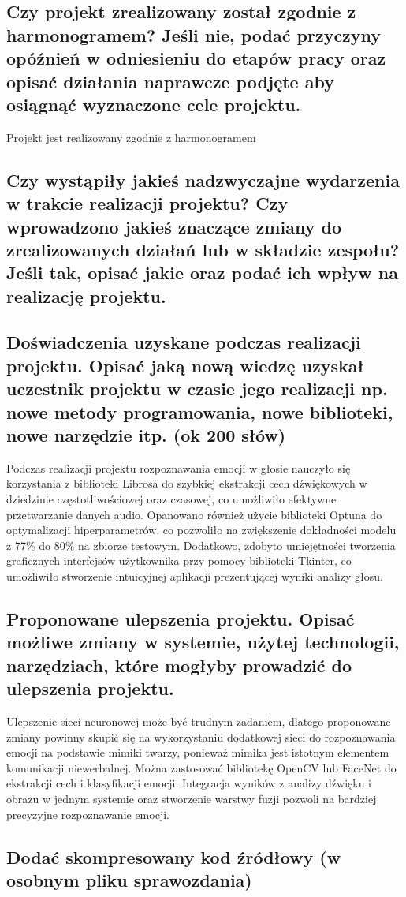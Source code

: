 \documentclass[12pt,titlepage]{article}
\begin{document}
\subsection{Czy projekt zrealizowany został zgodnie z harmonogramem? Jeśli nie, podać przyczyny opóźnień w odniesieniu do etapów pracy oraz opisać działania naprawcze podjęte aby osiągnąć wyznaczone cele projektu.}
Projekt jest realizowany zgodnie z harmonogramem

\subsection{Czy wystąpiły jakieś nadzwyczajne wydarzenia w trakcie realizacji projektu? Czy wprowadzono jakieś znaczące zmiany do zrealizowanych działań lub w składzie zespołu? Jeśli tak, opisać jakie oraz podać ich wpływ na realizację projektu.}

\subsection{Doświadczenia uzyskane podczas realizacji projektu. Opisać jaką nową wiedzę uzyskał uczestnik projektu w czasie jego realizacji np. nowe metody programowania, nowe biblioteki, nowe narzędzie itp. (ok 200 słów)}
Podczas realizacji projektu rozpoznawania emocji w głosie nauczyło się korzystania z biblioteki Librosa do szybkiej ekstrakcji cech dźwiękowych w dziedzinie częstotliwościowej oraz czasowej, co umożliwiło efektywne przetwarzanie danych audio. Opanowano również użycie biblioteki Optuna do optymalizacji hiperparametrów, co pozwoliło na zwiększenie dokładności modelu z 77\% do 80\% na zbiorze testowym. Dodatkowo, zdobyto umiejętności tworzenia graficznych interfejsów użytkownika przy pomocy biblioteki Tkinter, co umożliwiło stworzenie intuicyjnej aplikacji prezentującej wyniki analizy głosu.

\subsection{Proponowane ulepszenia projektu. Opisać możliwe zmiany w systemie, użytej technologii, narzędziach, które mogłyby prowadzić do ulepszenia projektu.}
Ulepszenie sieci neuronowej może być trudnym zadaniem, dlatego proponowane zmiany powinny skupić się na wykorzystaniu dodatkowej sieci do rozpoznawania emocji na podstawie mimiki twarzy, ponieważ mimika jest istotnym elementem komunikacji niewerbalnej. Można zastosować bibliotekę OpenCV lub FaceNet do ekstrakcji cech i klasyfikacji emocji. Integracja wyników z analizy dźwięku i obrazu w jednym systemie oraz stworzenie warstwy fuzji pozwoli na bardziej precyzyjne rozpoznawanie emocji.
\subsection{Dodać skompresowany kod źródłowy (w osobnym pliku sprawozdania)}
\end{document}
